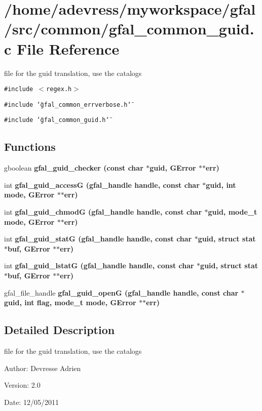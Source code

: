 \section{/home/adevress/myworkspace/gfal/src/common/gfal\_\-common\_\-guid.c File Reference}
\label{gfal__common__guid_8c}
file for the guid translation, use the catalogs 

{\tt \#include $<$regex.h$>$}\par
{\tt \#include \char`\"{}gfal\_\-common\_\-errverbose.h\char`\"{}}\par
{\tt \#include \char`\"{}gfal\_\-common\_\-guid.h\char`\"{}}\par
\subsection*{Functions}
\begin{CompactItemize}
\item 
gboolean \bf{gfal\_\-guid\_\-checker} (const char $\ast$guid, GError $\ast$$\ast$err)
\item 
int \bf{gfal\_\-guid\_\-access\-G} (gfal\_\-handle handle, const char $\ast$guid, int mode, GError $\ast$$\ast$err)
\item 
int \bf{gfal\_\-guid\_\-chmod\-G} (gfal\_\-handle handle, const char $\ast$guid, mode\_\-t mode, GError $\ast$$\ast$err)
\item 
int \bf{gfal\_\-guid\_\-stat\-G} (gfal\_\-handle handle, const char $\ast$guid, struct stat $\ast$buf, GError $\ast$$\ast$err)
\item 
int \bf{gfal\_\-guid\_\-lstat\-G} (gfal\_\-handle handle, const char $\ast$guid, struct stat $\ast$buf, GError $\ast$$\ast$err)
\item 
gfal\_\-file\_\-handle \bf{gfal\_\-guid\_\-open\-G} (gfal\_\-handle handle, const char $\ast$guid, int flag, mode\_\-t mode, GError $\ast$$\ast$err)
\end{CompactItemize}


\subsection{Detailed Description}
file for the guid translation, use the catalogs 

\begin{Desc}
\item[Author:]Devresse Adrien \end{Desc}
\begin{Desc}
\item[Version:]2.0 \end{Desc}
\begin{Desc}
\item[Date:]12/05/2011 \end{Desc}



